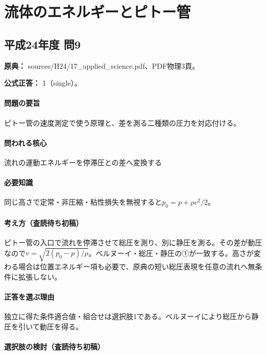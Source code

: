 \section{流体のエネルギーとピトー管}

\subsection{平成24年度 問9}
\label{q:h24-reg-applied-09}

\noindent\textbf{原典：} sources/H24/17\_applied\_science.pdf、PDF物理3頁。

\textbf{公式正答：} 1（single）。

\paragraph{問題の要旨} ピトー管の速度測定で使う原理と、差を測る二種類の圧力を対応付ける。

\paragraph{問われる核心} 流れの運動エネルギーを停滞圧との差へ変換する

\paragraph{必要知識} 同じ高さで定常・非圧縮・粘性損失を無視すると\(p_0=p+\rho v^2/2\)。

\paragraph{考え方（査読待ち初稿）} ピトー管の入口で流れを停滞させて総圧を測り、別に静圧を測る。その差が動圧なので\(v=\sqrt{2(p_0-p)/\rho}\)。ベルヌーイ・総圧・静圧の①が一致する。高さが変わる場合は位置エネルギー項も必要で、原典の短い総圧表現を任意の流れへ無条件に拡張しない。

\paragraph{正答を選ぶ理由} 独立に得た条件適合値・組合せは選択肢1である。ベルヌーイにより総圧から静圧を引いて動圧を得る。

\paragraph{選択肢の検討（査読待ち初稿）}\mbox{}\par

